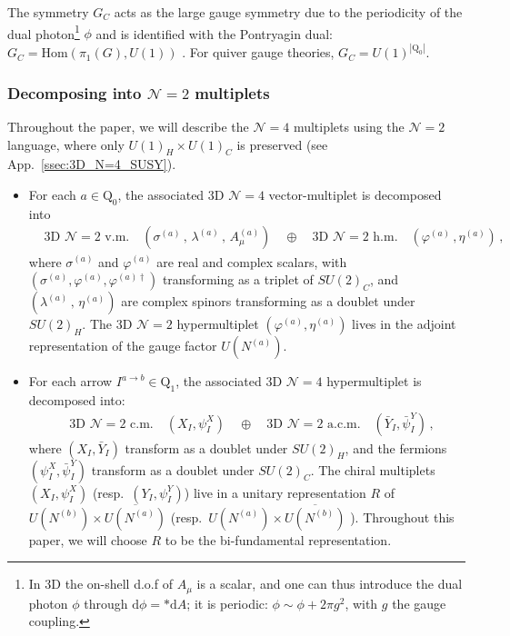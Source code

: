 \documentclass[12pt,a4paper]{article}
\renewcommand{\(}{\left(}
\renewcommand{\)}{\right)}
\renewcommand{\(}{\left(}
\renewcommand{\)}{\right)}
\begin{document}
\medskip

The symmetry $G_C$ acts as the large gauge symmetry due to the periodicity of the dual photon\footnote{In 3D the on-shell d.o.f of $A_\mu$ is a scalar, and one can thus introduce the dual photon $\phi$ through $\mathrm{d}\phi=\ast\mathrm{d}A$; it is periodic: $\phi\sim\phi+2\pi g^2$, with $g$ the gauge coupling.} $\phi$ and is identified with the Pontryagin dual: $G_C=\mathrm{Hom}(\pi_1(G),U(1))$ \cite{Bullimore:2016hdc}. 
For quiver gauge theories, 
$G_C=U(1)^{|\mathrm{Q}_0|}$.


\subsubsection{\texorpdfstring{Decomposing into $\mathcal{N}=2$ multiplets}{Decomposing into N=2 multiplets}}
\label{sssec:IntoN2}
Throughout the paper, we will describe the $\mathcal{N}=4$ multiplets using the $\mathcal{N}=2$ language, where only $U(1)_H\times U(1)_C$ is preserved (see App.~\ref{ssec:3D_N=4_SUSY}).
\begin{itemize}
\item For each $a\in \mathrm{Q}_0$, the associated 3D $\mathcal{N}=4$ vector-multiplet  is decomposed into 
\begin{equation}
\begin{aligned}
&\textrm{3D $\mathcal{N}=2$ v.m.} \quad (\sigma^{(a)}\,,\, \lambda^{(a)}\, ,\, A^{(a)}_{\mu}) \quad
\oplus \quad \textrm{3D $\mathcal{N}=2$ h.m.} \quad (\varphi^{(a)}\, , \eta^{(a)})\,,
\end{aligned}    
\end{equation}
where $\sigma^{(a)}$ and $\varphi^{(a)}$ are real and complex scalars, with $(\sigma^{(a)}, \varphi^{(a)}, \varphi^{(a)\dag})$ transforming as a triplet of $SU(2)_C$, and 
$(\lambda^{(a)}\, ,\, \eta^{(a)})$ are complex spinors transforming as a doublet under $SU(2)_H$.
The 3D $\mathcal{N}=2$  hypermultiplet $(\varphi^{(a)},\eta^{(a)})$ lives in the adjoint representation of the gauge factor $U(N^{(a)})$.

\item For each arrow $I^{a\rightarrow b}\in \mathrm{Q}_1$, the associated 3D $\mathcal{N}=4$ hypermultiplet is decomposed into:
\begin{equation}
\begin{aligned}
&\textrm{3D $\mathcal{N}=2$ c.m.} \quad (X_{I}, \psi^{X}_I )
\quad
\oplus \quad 
\textrm{3D $\mathcal{N}=2$ a.c.m.} \quad (\bar{Y}_I, \bar{\psi}^{Y}_I) \,,
\end{aligned}    
\end{equation}
where $(X_I,\bar{Y}_I)$ transform as a doublet under $SU(2)_H$, and the fermions $(\psi^X_I,\bar{\psi}^{Y}_I)$ transform as a doublet under $SU(2)_C$. 
The chiral multiplets $(X_I,\psi^X_I)$ (resp.\ $(Y_I,\psi^Y_I)$) live in a unitary representation $R$ of $U(N^{(b)})\times \overline{U(N^{(a)})}$ (resp.\ $U(N^{(a)})\times \overline{U(N^{(b)})}$ ).
Throughout this paper, we will choose $R$ to be the bi-fundamental representation.
\end{itemize}
\end{document}
